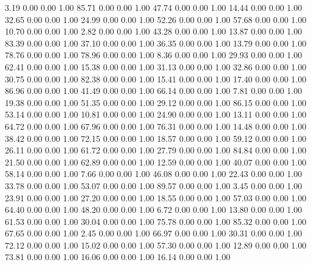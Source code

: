     3.19   0.00   0.00   1.00
   85.71   0.00   0.00   1.00
   47.74   0.00   0.00   1.00
   14.44   0.00   0.00   1.00
   32.65   0.00   0.00   1.00
   24.99   0.00   0.00   1.00
   52.26   0.00   0.00   1.00
   57.68   0.00   0.00   1.00
   10.70   0.00   0.00   1.00
    2.82   0.00   0.00   1.00
   43.28   0.00   0.00   1.00
   13.87   0.00   0.00   1.00
   83.39   0.00   0.00   1.00
   37.10   0.00   0.00   1.00
   36.35   0.00   0.00   1.00
   13.79   0.00   0.00   1.00
   78.76   0.00   0.00   1.00
   78.96   0.00   0.00   1.00
    8.36   0.00   0.00   1.00
   29.93   0.00   0.00   1.00
   62.41   0.00   0.00   1.00
   15.38   0.00   0.00   1.00
   31.13   0.00   0.00   1.00
   32.86   0.00   0.00   1.00
   30.75   0.00   0.00   1.00
   82.38   0.00   0.00   1.00
   15.41   0.00   0.00   1.00
   17.40   0.00   0.00   1.00
   86.96   0.00   0.00   1.00
   41.49   0.00   0.00   1.00
   66.14   0.00   0.00   1.00
    7.81   0.00   0.00   1.00
   19.38   0.00   0.00   1.00
   51.35   0.00   0.00   1.00
   29.12   0.00   0.00   1.00
   86.15   0.00   0.00   1.00
   53.14   0.00   0.00   1.00
   10.81   0.00   0.00   1.00
   24.90   0.00   0.00   1.00
   13.11   0.00   0.00   1.00
   64.72   0.00   0.00   1.00
   67.96   0.00   0.00   1.00
   76.31   0.00   0.00   1.00
   14.48   0.00   0.00   1.00
   38.42   0.00   0.00   1.00
   72.15   0.00   0.00   1.00
   18.57   0.00   0.00   1.00
   59.12   0.00   0.00   1.00
   26.11   0.00   0.00   1.00
   61.72   0.00   0.00   1.00
   27.79   0.00   0.00   1.00
   84.84   0.00   0.00   1.00
   21.50   0.00   0.00   1.00
   62.89   0.00   0.00   1.00
   12.59   0.00   0.00   1.00
   40.07   0.00   0.00   1.00
   58.14   0.00   0.00   1.00
    7.66   0.00   0.00   1.00
   46.08   0.00   0.00   1.00
   22.43   0.00   0.00   1.00
   33.78   0.00   0.00   1.00
   53.07   0.00   0.00   1.00
   89.57   0.00   0.00   1.00
    3.45   0.00   0.00   1.00
   23.91   0.00   0.00   1.00
   27.20   0.00   0.00   1.00
   18.55   0.00   0.00   1.00
   57.03   0.00   0.00   1.00
   64.40   0.00   0.00   1.00
   48.20   0.00   0.00   1.00
    6.72   0.00   0.00   1.00
   13.80   0.00   0.00   1.00
   61.53   0.00   0.00   1.00
   30.04   0.00   0.00   1.00
   75.78   0.00   0.00   1.00
   85.32   0.00   0.00   1.00
   67.65   0.00   0.00   1.00
    2.45   0.00   0.00   1.00
   66.97   0.00   0.00   1.00
   30.31   0.00   0.00   1.00
   72.12   0.00   0.00   1.00
   15.02   0.00   0.00   1.00
   57.30   0.00   0.00   1.00
   12.89   0.00   0.00   1.00
   73.81   0.00   0.00   1.00
   16.06   0.00   0.00   1.00
   16.14   0.00   0.00   1.00
